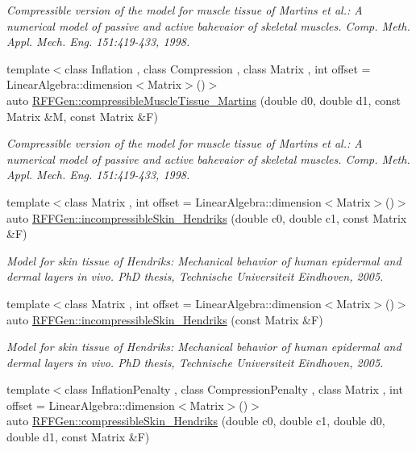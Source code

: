 \begin{DoxyCompactItemize}
\begin{DoxyCompactList}\small\item\em Compressible version of the model for muscle tissue of Martins et al.\-: A numerical model of passive and active bahevaior of skeletal muscles. Comp. Meth. Appl. Mech. Eng. 151\-:419-\/433, 1998. \end{DoxyCompactList}\item 
{\footnotesize template$<$class Inflation , class Compression , class Matrix , int offset = Linear\-Algebra\-::dimension$<$\-Matrix$>$()$>$ }\\auto \hyperlink{group__Biomechanics_ga3bd109a716f5eab7c263fa42cb66a937}{R\-F\-F\-Gen\-::compressible\-Muscle\-Tissue\-\_\-\-Martins} (double d0, double d1, const Matrix \&M, const Matrix \&F)
\begin{DoxyCompactList}\small\item\em Compressible version of the model for muscle tissue of Martins et al.\-: A numerical model of passive and active bahevaior of skeletal muscles. Comp. Meth. Appl. Mech. Eng. 151\-:419-\/433, 1998. \end{DoxyCompactList}\item 
{\footnotesize template$<$class Matrix , int offset = Linear\-Algebra\-::dimension$<$\-Matrix$>$()$>$ }\\auto \hyperlink{group__Biomechanics_ga2c1299d3275e15fee450d33b69f3c537}{R\-F\-F\-Gen\-::incompressible\-Skin\-\_\-\-Hendriks} (double c0, double c1, const Matrix \&F)
\begin{DoxyCompactList}\small\item\em Model for skin tissue of Hendriks\-: Mechanical behavior of human epidermal and dermal layers in vivo. Ph\-D thesis, Technische Universiteit Eindhoven, 2005. \end{DoxyCompactList}\item 
{\footnotesize template$<$class Matrix , int offset = Linear\-Algebra\-::dimension$<$\-Matrix$>$()$>$ }\\auto \hyperlink{group__Biomechanics_gae120c2a20a841a63c19cee23f7eba317}{R\-F\-F\-Gen\-::incompressible\-Skin\-\_\-\-Hendriks} (const Matrix \&F)
\begin{DoxyCompactList}\small\item\em Model for skin tissue of Hendriks\-: Mechanical behavior of human epidermal and dermal layers in vivo. Ph\-D thesis, Technische Universiteit Eindhoven, 2005. \end{DoxyCompactList}\item 
{\footnotesize template$<$class Inflation\-Penalty , class Compression\-Penalty , class Matrix , int offset = Linear\-Algebra\-::dimension$<$\-Matrix$>$()$>$ }\\auto \hyperlink{group__Biomechanics_ga749204473b9790e8479bbbbe0b703694}{R\-F\-F\-Gen\-::compressible\-Skin\-\_\-\-Hendriks} (double c0, double c1, double d0, double d1, const Matrix \&F)

\end{DoxyCompactItemize}
